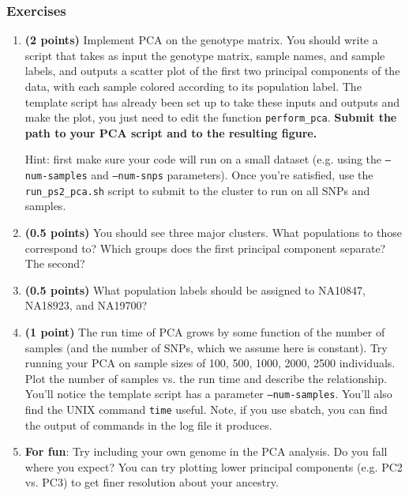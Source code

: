\documentclass[12pt]{article}
\begin{document}
\subsubsection*{Exercises}
\begin{enumerate}
\item \textbf{(2 points)}
Implement PCA on the genotype matrix. You should write a script that takes as input the genotype matrix, sample names, and sample labels, and outputs a scatter plot of the first two principal components of the data, with each sample colored according to its population label. The template script has already been set up to take these inputs and outputs and make the plot, you just need to edit the function \texttt{perform\_pca}. \textbf{Submit the path to your PCA script and to the resulting figure.}

Hint: first make sure your code will run on a small dataset (e.g. using the \texttt{--num-samples} and \texttt{--num-snps} parameters). Once you're satisfied, use the \texttt{run\_ps2\_pca.sh} script to submit to the cluster to run on all SNPs and samples.

\item \textbf{(0.5 points)}
You should see three major clusters. What populations to those correspond to? Which groups does the first principal component separate? The second?

\item \textbf{(0.5 points)}
What population labels should be assigned to NA10847, NA18923, and NA19700?

\item \textbf{(1 point)}
The run time of PCA grows by some function of the number of samples (and the number of SNPs, which we assume here is constant). Try running your PCA on sample sizes of 100, 500, 1000, 2000, 2500 individuals. Plot the number of samples vs. the run time and describe the relationship. You'll notice the template script has a parameter \texttt{--num-samples}. You'll also find the UNIX command \texttt{time} useful. Note, if you use sbatch, you can find the output of commands in the log file it produces.

\item \textbf{For fun}: Try including your own genome in the PCA analysis. Do you fall where you expect? You can try plotting lower principal components (e.g. PC2 vs. PC3) to get finer resolution about your ancestry. 

\end{enumerate}
\end{document}
